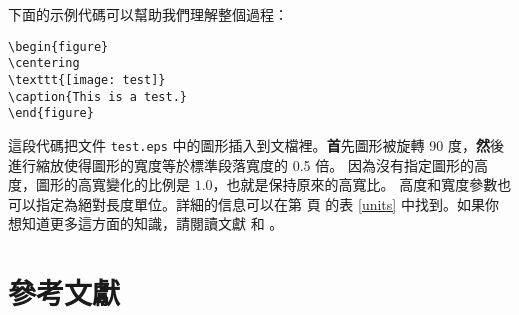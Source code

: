 

下面的示例代碼可以幫助我們理解整個過程：
\begin{code}
\begin{verbatim}
\begin{figure}
\centering
\texttt{[image: test]}
\caption{This is a test.}
\end{figure}
\end{verbatim}
\end{code}
這段代碼把文件 \texttt{test.eps} 中的圖形插入到文檔裡。{\textbf
首先}圖形被旋轉 90 度，{\textbf
然後}進行縮放使得圖形的寬度等於標準段落寬度的 0.5 倍。
因為沒有指定圖形的高度，圖形的高寬變化的比例是 $1.0$，也就是保持原來的高寬比。
高度和寬度參數也可以指定為絕對長度單位。詳細的信息可以在第 \pageref{units} 頁
的表 \ref{units} 中找到。如果你想知道更多這方面的知識，請閱讀文獻 \cite{graphics} 
和 \cite{eps}。

\section{參考文獻}

